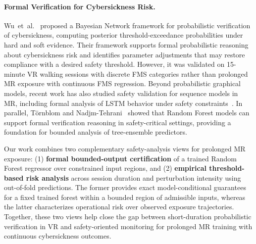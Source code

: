 \documentclass[review]{vgtc}              %
\begin{document}
\paragraph{Formal Verification for Cybersickness Risk.}
Wu~et~al.~\cite{Wu2025BN} proposed a Bayesian Network framework for probabilistic verification of cybersickness, computing posterior threshold-exceedance probabilities under hard and soft evidence. Their framework supports formal probabilistic reasoning about cybersickness risk and identifies parameter adjustments that may restore compliance with a desired safety threshold. However, it was validated on 15-minute VR walking sessions with discrete FMS categories rather than prolonged MR exposure with continuous FMS regression. Beyond probabilistic graphical models, recent work has also studied safety validation for sequence models in MR, including formal analysis of LSTM behavior under safety constraints~\cite{Huang:2025:LSTM}. In parallel, T\"{o}rnblom and Nadjm-Tehrani~\cite{Tornblom2018FormalRF} showed that Random Forest models can support formal verification reasoning in safety-critical settings, providing a foundation for bounded analysis of tree-ensemble predictors.

Our work combines two complementary safety-analysis views for prolonged MR exposure: (1) \textbf{formal bounded-output certification} of a trained Random Forest regressor over constrained input regions, and (2) \textbf{empirical threshold-based risk analysis} across session duration and perturbation intensity using out-of-fold predictions. The former provides exact model-conditional guarantees for a fixed trained forest within a bounded region of admissible inputs, whereas the latter characterizes operational risk over observed exposure trajectories. Together, these two views help close the gap between short-duration probabilistic verification in VR and safety-oriented monitoring for prolonged MR training with continuous cybersickness outcomes.

















\end{document}
